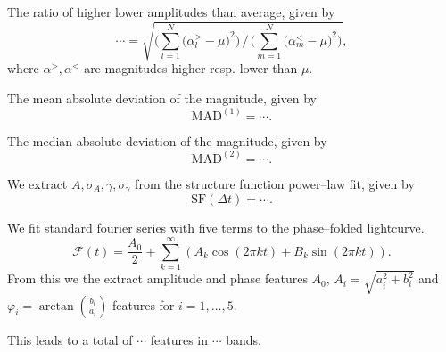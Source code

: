 \begin{enumerate}
 The ratio of higher \resp lower amplitudes than average, given by
\begin{equation}\cdots = \sqrt{ \Big(\sum\limits_{l=1}^N \big( \alpha^{>}_l - \mu \big)^2\Big) \, / \, \Big(\sum\limits_{m=1}^N \big( \alpha^{<}_m - \mu \big)^2\Big)},\end{equation}
where $\alpha^{>}, \alpha^{<}$ are magnitudes higher resp. lower than $\mu$.

 The mean absolute deviation of the magnitude, given by
\begin{equation}\text{MAD}^{(1)} = \cdots.\end{equation}

 The median absolute deviation of the magnitude, given by
\begin{equation}\text{MAD}^{(2)} = \cdots.\end{equation}

 We extract $A, \sigma_A, \gamma, \sigma_\gamma$ from the structure function power--law fit, given by
\begin{equation}\text{SF}(\Delta t) = \cdots.\end{equation}

 We fit standard fourier series with five terms to the phase--folded lightcurve.
\begin{equation}\mathcal{F}(t) = \frac{A_0}{2} + \sum_{k=1}^{\infty} ( A_k \cos(2 \pi k t) + B_k \sin(2 \pi k t) ).\end{equation}
From this we the extract amplitude and phase features $A_0$, $A_i = \sqrt{a_i^2 + b_i^2}$ and $\varphi_i = \arctan(\frac{b_i}{a_i})$ features for $i = 1, \ldots, 5$.



\end{enumerate}

This leads to a total of $\cdots$ features in $\cdots$ bands.


